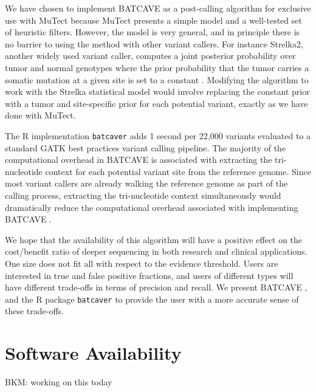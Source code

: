 \documentclass[a4,center,fleqn]{NAR}
\newcommand{\bkmcomment}[1]{{\color{blue}BKM: #1}}
\newcommand{\batcave}{BATCAVE }
\begin{document}
We have chosen to implement \batcave as a post-calling algorithm for exclusive use with MuTect because MuTect presents a simple model and a well-tested set of heuristic filters.
However, the model is very general, and in principle there is no barrier to using the method with other variant callers.
For instance Strelka2, another widely used variant caller, computes a joint posterior probability over tumor and normal genotypes where the prior probability that the tumor carries a somatic mutation at a given site is set to a constant \cite{Kim2018}.
Modifying the algorithm to work with the Strelka statistical model would involve replacing the constant prior with a tumor and site-specific prior for each potential variant, exactly as we have done with MuTect.

The R implementation \texttt{batcaver} adds 1 second per 22,000 variants evaluated to a standard GATK best practices variant calling pipeline. 
The majority of the computational overhead in \batcave is associated with extracting the tri-nucleotide context for each potential variant site from the reference genome.
Since most variant callers are already walking the reference genome as part of the calling process, extracting the tri-nucleotide context simultaneously would dramatically reduce the computational overhead associated with implementing \batcave.

We hope that the availability of this algorithm will have a positive effect on the cost/benefit ratio of deeper sequencing in both research and clinical applications.
One size does not fit all with respect to the evidence threshold. 
Users are interested in true and false positive fractions, and users of different types will have different trade-offs in terms of precision and recall.
We present \batcave, and the R package \texttt{batcaver} to provide the user with a more accurate sense of these trade-offs.


\section{Software Availability}
\bkmcomment{working on this today}
\end{document}
